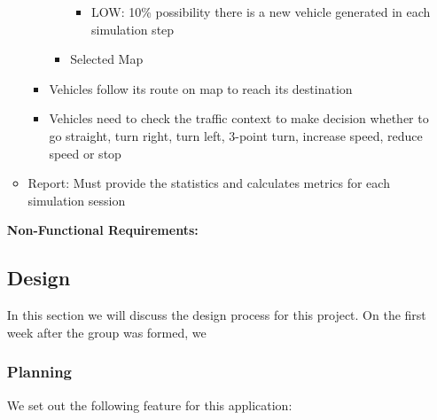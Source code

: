\documentclass[11pt]{article}
\begin{document}
\begin{itemize}
\begin{itemize}
\begin{itemize}
\begin{itemize}
\begin{itemize}
                \item LOW: 10\% possibility there is a new vehicle generated in each simulation step
                \end{itemize}
            \item Selected Map
            
            
            \end{itemize}
        \item 
        Vehicles follow its route on map to reach its destination
        \item Vehicles need to check the traffic context to make decision whether to go straight, turn right, turn left, 3-point turn, increase speed, reduce speed or stop
        \end{itemize}
        
        
       
        \item Report: Must provide the statistics and calculates     metrics  for each simulation session
        
        \end{itemize}


    
    {\bf{Non-Functional Requirements:}} \newline
    
	
\subsection{Design}
In this section we will discuss the design process for this project. On the first week after the group was formed, we 

    \subsubsection{Planning}
    We set out the following feature for this application:
    

\end{itemize}
\end{document}
